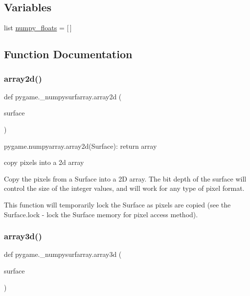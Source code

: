 \subsection*{Variables}
\begin{DoxyCompactItemize}
\item 
list \hyperlink{namespacepygame_1_1__numpysurfarray_a819bcca31525ef44e1b922e381542c7e}{numpy\+\_\+floats} = \mbox{[}$\,$\mbox{]}
\end{DoxyCompactItemize}


\subsection{Function Documentation}
\mbox{\label{namespacepygame_1_1__numpysurfarray_a607b94c627bde5d92dad78c0598e4e16}} 
\subsubsection{\texorpdfstring{array2d()}{array2d()}}
{\footnotesize\ttfamily def pygame.\+\_\+numpysurfarray.\+array2d (\begin{DoxyParamCaption}\item[{}]{surface }\end{DoxyParamCaption})}

\begin{DoxyVerb}pygame.numpyarray.array2d(Surface): return array

copy pixels into a 2d array

Copy the pixels from a Surface into a 2D array. The bit depth of the
surface will control the size of the integer values, and will work
for any type of pixel format.

This function will temporarily lock the Surface as pixels are copied
(see the Surface.lock - lock the Surface memory for pixel access
method).
\end{DoxyVerb}
 \mbox{\label{namespacepygame_1_1__numpysurfarray_a386b3c0b773be2393e85debcd345e54e}} 
\subsubsection{\texorpdfstring{array3d()}{array3d()}}
{\footnotesize\ttfamily def pygame.\+\_\+numpysurfarray.\+array3d (\begin{DoxyParamCaption}\item[{}]{surface }\end{DoxyParamCaption})}

